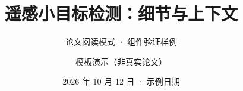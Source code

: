 \title[论文模式演示]{遥感小目标检测：细节与上下文}
\subtitle{论文阅读模式 · 组件验证样例}
\author{模板演示（非真实论文）}
\date{2026 年 10 月 12 日 · 示例日期}
\renewcommand{\ReportStatus}{模板演示：论文、方法与数字均为虚构示意}
